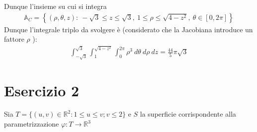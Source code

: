 \documentclass[a4paper, oneside]{book}
\begin{document}
Dunque l'insieme su cui si integra
\begin{gather*}
    \mathbb{A}_C = \left\{(\rho, \theta, z) : \ -\sqrt{3} \leq z \leq \sqrt{3}, \ 1 \leq \rho \leq \sqrt{4 - z^{2}}, \ \theta \in [0, 2\pi]   \right\}
\end{gather*}
Dunque l'integrale triplo da svolgere è (considerato che la Jacobiana introduce 
un fattore $\rho$ ):
\begin{gather*}
    \int_{-\sqrt{3} }^{\sqrt{3} } \int_{1}^{\sqrt{4 - z^{2}} } \int_{0}^{2\pi} \rho^{3} \ d\theta \ d\rho \ dz = \frac{44}{5}\pi \sqrt{3}    
\end{gather*}

\section{Esercizio 2}
Sia $T = \{(u,v) \in \mathbb{R}^2 : 1 \leq u \leq v ; v \leq 2\}$ e $S$ la superficie corrispondente alla parametrizzazione $\varphi : T \to \mathbb{R}^3$
\end{document}

